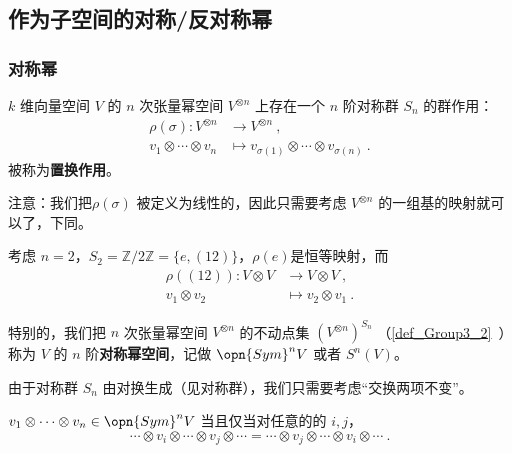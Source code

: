 
\begin{issues}
\issueTODO
\issueDraft
{}
\end{issues}


\subsection{作为子空间的对称/反对称幂}

\subsubsection{对称幂}

$k$ 维向量空间 $V$ 的 $n$ 次张量幂空间 $V^{\otimes n}$ 上存在一个 $n$ 阶对称群 $S_n$ 的群作用：
\begin{equation}
\begin{aligned}
\rho(\sigma): V^{\otimes n} &\to V^{\otimes n}~, \\
v_1 \otimes \cdots \otimes v_n &\mapsto v_{\sigma(1)} \otimes \cdots \otimes v_{\sigma(n)}~.
\end{aligned}
\end{equation}
被称为\textbf{置换作用}。

注意：我们把$\rho(\sigma)$ 被定义为线性的，因此只需要考虑 $V^{\otimes n}$ 的一组基的映射就可以了，下同。

\begin{example}{}
考虑 $n = 2$，$S_2 = \mathbb{Z}/2\mathbb{Z} = \{e, (1 2)\}$，$\rho(e)$是恒等映射，而
\begin{equation}
\begin{aligned}
\rho((1 2)): V \otimes V &\to V \otimes V~, \\
v_1 \otimes v_2 &\mapsto v_2 \otimes v_1~.
\end{aligned}
\end{equation}
\end{example}

特别的，我们把 $n$ 次张量幂空间 $V^{\otimes n}$ 的不动点集 $(V^{\otimes n})^{S_n}$ （\autoref{def_Group3_2}~）称为 $V$ 的 $n$ 阶\textbf{对称幂空间}，记做 $\opn{Sym}^n V$ 或者 $S^n(V)$。

由于对称群 $S_n$ 由对换生成（见对称群），我们只需要考虑“交换两项不变”。
\begin{theorem}{}
$v_1 \otimes \cdots \otimes v_n \in \opn{Sym}^n V$ 当且仅当对任意的的 $i, j$，
\begin{equation}
\cdots \otimes v_i \otimes \cdots \otimes v_j \otimes \cdots = \cdots \otimes v_j \otimes \cdots \otimes v_i \otimes \cdots~.
\end{equation}

\end{theorem}

